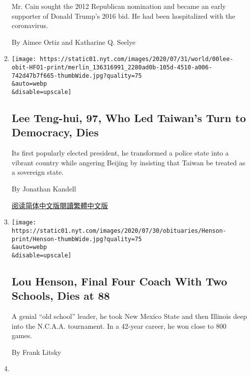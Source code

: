 \begin{enumerate}
  Mr. Cain sought the 2012 Republican nomination and became an early
  supporter of Donald Trump's 2016 bid. He had been hospitalized with
  the coronavirus.

  By Aimee Ortiz and Katharine Q. Seelye
\item
  \href{/2020/07/30/world/asia/lee-teng-hui-dead.html}{}

  \texttt{[image: https://static01.nyt.com/images/2020/07/31/world/00lee-obit-HFO1-print/merlin\_136316991\_2280ad0b-105d-4510-a006-742d47b7f665-thumbWide.jpg?quality=75\\\&auto=webp\\\&disable=upscale]}

  \hypertarget{lee-teng-hui-97-who-led-taiwans-turn-to-democracy-dies}{%
  \subsection{Lee Teng-hui, 97, Who Led Taiwan's Turn to Democracy,
  Dies}\label{lee-teng-hui-97-who-led-taiwans-turn-to-democracy-dies}}

  Its first popularly elected president, he transformed a police state
  into a vibrant country while angering Beijing by insisting that Taiwan
  be treated as a sovereign state.

  By Jonathan Kandell

  \href{https://cn.nytimes.com/asia-pacific/20200730/lee-teng-hui-dead/}{阅读简体中文版}\href{https://cn.nytimes.com/asia-pacific/20200730/lee-teng-hui-dead/zh-hant/}{閱讀繁體中文版}
\item
  \href{/2020/07/29/sports/ncaabasketball/lou-henson-dead.html}{}

  \texttt{[image: https://static01.nyt.com/images/2020/07/30/obituaries/Henson-print/Henson-thumbWide.jpg?quality=75\\\&auto=webp\\\&disable=upscale]}

  \hypertarget{lou-henson-final-four-coach-with-two-schools-dies-at-88}{%
  \subsection{Lou Henson, Final Four Coach With Two Schools, Dies at
  88}\label{lou-henson-final-four-coach-with-two-schools-dies-at-88}}

  A genial ``old school'' leader, he took New Mexico State and then
  Illinois deep into the N.C.A.A. tournament. In a 42-year career, he
  won close to 800 games.

  By Frank Litsky
\item
  \href{/2020/07/29/obituaries/renada-mcguire-dead-coronavirus.html}{}


\end{enumerate}
